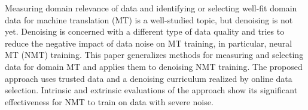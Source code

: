 Measuring domain relevance of data and identifying or selecting well-fit domain data for machine translation (MT) is a well-studied topic, but denoising is not yet. Denoising is concerned with a different type of data quality and tries to reduce the negative impact of data noise on MT training, in particular, neural MT (NMT) training. This paper generalizes methods for measuring and selecting data for domain MT and applies them to denoising NMT training. The proposed approach uses trusted data and a denoising curriculum realized by online data selection. Intrinsic and extrinsic evaluations of the approach show its significant effectiveness for NMT to train on data with severe noise.
